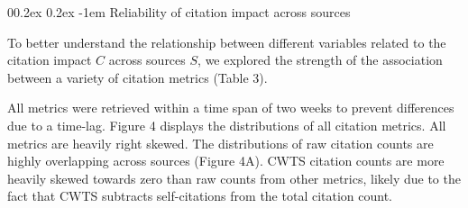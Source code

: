 \documentclass[
  man,floatsintext]{apa6}
\makeatletter
\let\oldparagraph\paragraph
\renewcommand{\paragraph}[1]{\oldparagraph{#1}\mbox{}}
\renewcommand{\paragraph}{\@startsection{paragraph}{4}{\parindent}%
  {0\baselineskip \@plus 0.2ex \@minus 0.2ex}%
  {-1em}%
  {\normalfont\normalsize\bfseries\itshape\typesectitle}}
\makeatother
\begin{document}
\hypertarget{reliability-of-citation-impact-across-sources}{%
\paragraph{Reliability of citation impact across sources}\label{reliability-of-citation-impact-across-sources}}

To better understand the relationship between different variables related to the citation impact \(C\) across sources \(S\), we explored the strength of the association between a variety of citation metrics (Table 3).

All metrics were retrieved within a time span of two weeks to prevent differences due to a time-lag. Figure 4 displays the distributions of all citation metrics. All metrics are heavily right skewed. The distributions of raw citation counts are highly overlapping across sources (Figure 4A). CWTS citation counts are more heavily skewed towards zero than raw counts from other metrics, likely due to the fact that CWTS subtracts self-citations from the total citation count.

\hfill\break
\end{document}
